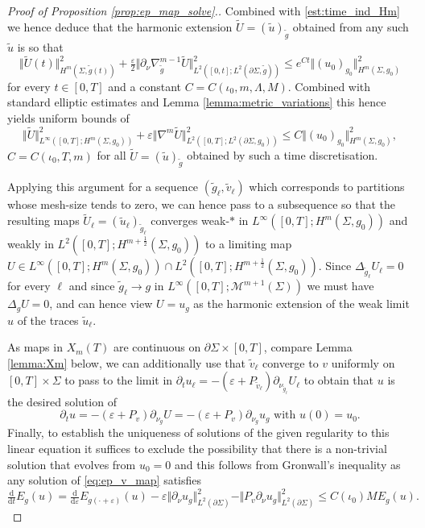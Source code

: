 \documentclass[10pt,reqno]{amsart}
\theoremstyle{plain}
\theoremstyle{definition}
\numberwithin{equation}{section}
\newcommand{\La}{\Lambda}
\newcommand{\Si}{\Sigma}
\newcommand{\ep}{\varepsilon}
\newcommand{\norm}[1]{\Vert#1\Vert}
\newcommand{\beq}{\begin{equation}}
\newcommand{\eeq}{\end{equation}}
\newcommand{\beqs}{\begin{equation*}}
\newcommand{\eeqs}{\end{equation*}}
\newcommand{\dd}{\mathrm{d}} %
\newcommand{\eps}{\varepsilon}
\newcommand{\pSi}{{\partial \Sigma}}
\newcommand{\MM}{\mathcal{M}} %
\newcommand{\hf}{\frac{1}{2}} %
\newcommand{\p}{\partial} %
\begin{document}
\begin{proof}[Proof of Proposition \ref{prop:ep_map_solve}.]
    Combined with \eqref{est:time_ind_Hm} we hence deduce that the harmonic extension $\tilde U=(\tilde{u})_{\tilde g}$ obtained from any such  $\tilde u$ is so that 
    \beq\label{est:pv_const_apriori1}
        \norm{\tilde U(t)}_{H^m(\Si,\tilde g(t))}^2 + \tfrac{\ep}{2}\norm{\p_\nu \nabla_{\tilde g}^{m-1}\tilde U}_{L^2([0,t];L^2(\p\Si,\tilde{g}))}^2 \le e^{Ct}\norm{(u_0)_{g_0}}_{H^m(\Si, g_0)}^2
    \eeq
    for every $t\in[0,T]$ and a constant $C=C(\iota_0,m,\La,M)$. Combined with standard elliptic estimates and Lemma \ref{lemma:metric_variations} this hence yields uniform bounds of 
    \beq\label{est:pv_const_apriori1-g0}
        \norm{\tilde U}_{L^\infty([0,T];H^m(\Si,g_0))}^2 + \ep \norm{\nabla^{m} \tilde{U}}_{L^2([0,T]; L^2(\p\Si,g_0))}^2 \le C\norm{(u_0)_{g_0}}_{H^m(\Si, g_0)}^2,
    \eeq
    $C=C(\iota_0,T,m)$ for all $\tilde U=(\tilde u)_{\tilde g}$ obtained by such a time discretisation.     

    Applying this argument for a sequence  $(\tilde g_\ell,\tilde v_\ell)$ which corresponds to partitions whose mesh-size tends to zero, we can hence pass to a subsequence so that the resulting maps $\tilde U_\ell=(\tilde u_\ell)_{\tilde g_\ell}$ converges weak-$*$ in $L^\infty([0,T];H^m(\Si,g_0))$  and weakly in $L^2([0,T];H^{m+\hf}(\Si,g_0))$ to a limiting map $U \in L^\infty([0,T];H^m(\Si,g_0))\cap L^2([0,T];H^{m+\hf}(\Si,g_0))$. Since $\Delta_{\tilde g_{\ell}} U_{\ell}=0$ for every $\ell$ and since $\tilde g_\ell\to g$ in $L^\infty([0,T];\MM^{m+1}(\Si))$ we must have $\Delta_g U=0$, and can hence view $U=u_g$ as  the harmonic extension of the weak limit $u$ of the traces $\tilde{u}_\ell$.
    
    As maps in $X_m(T)$ are continuous on $\pSi\times [0,T]$, compare Lemma \ref{lemma:Xm} below,  we can additionally use that $\tilde v_\ell$ converge to $v$ uniformly on $[0,T]\times \Si$ to pass to the limit in $\p_t u_\ell=-(\eps+P_{\tilde v_\ell})\p_{\nu_{\tilde g_\ell}} U_\ell$ to obtain that $u$ is the desired solution of 
    \beqs
        \p_t u=-(\eps+P_{v})\p_{\nu_g} U= -(\eps+P_{v})\p_{\nu_g} u_g \text{ with } u(0)=u_0. 
    \eeqs
    Finally, to establish the uniqueness of solutions of the given regularity to this linear equation it suffices to exclude the possibility that there is a non-trivial solution that evolves from $u_0=0$ and this follows from Gronwall's inequality as any  solution of \eqref{eq:ep_v_map} satisfies
    \beq\label{est:energy-decay_ep_v_flow}
        \tfrac{\dd}{\dd t} E_g(u) = \tfrac{\dd}{\dd \eps}E_{g(\cdot+\eps)}(u)-\ep\norm{\p_{\nu}u_g}_{L^2(\p\Si)}^2-\norm{P_{v}\p_{\nu}u_g}_{L^2(\p\Si)}^2\leq C(\iota_0) M E_g(u).
    \eeq 
\end{proof}
\end{document}
